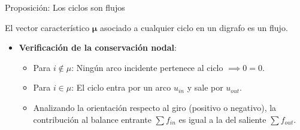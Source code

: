\documentclass[
  ignorenonframetext,
]{beamer}
\providecommand{\tightlist}{%
  \setlength{\itemsep}{0pt}\setlength{\parskip}{0pt}}
\begin{document}
\begin{frame}{Proposición: Los ciclos son flujos}
\label{proposiciuxf3n-los-ciclos-son-flujos}
\begin{tcolorbox}[enhanced jigsaw, opacityback=0, breakable, title=\textcolor{quarto-callout-note-color}{\faInfo}\hspace{0.5em}{Los ciclos son flujos}, colback=white, colbacktitle=quarto-callout-note-color!10!white, bottomrule=.15mm, opacitybacktitle=0.6, coltitle=black, bottomtitle=1mm, leftrule=.75mm, colframe=quarto-callout-note-color-frame, toptitle=1mm, titlerule=0mm, rightrule=.15mm, left=2mm, arc=.35mm, toprule=.15mm]

El vector característico \(\mathbf{\mu}\) asociado a cualquier ciclo en
un digrafo es un flujo.

\end{tcolorbox}

\begin{itemize}
\tightlist
\item
  \textbf{Verificación de la conservación nodal}:

  \begin{itemize}
  \tightlist
  \item
    Para \(i \notin \mu\): Ningún arco incidente pertenece al ciclo
    \(\implies 0 = 0\).
  \item
    Para \(i \in \mu\): El ciclo entra por un arco \(u_{in}\) y sale por
    \(u_{out}\).
  \item
    Analizando la orientación respecto al giro (positivo o negativo), la
    contribución al balance entrante \(\sum f_{in}\) es igual a la del
    saliente \(\sum f_{out}\).
  \end{itemize}
\end{itemize}
\end{frame}
\end{document}
